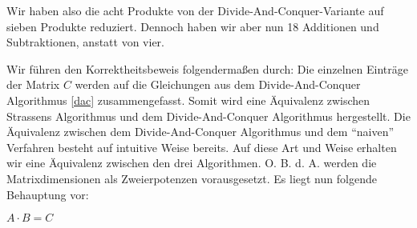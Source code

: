 Wir haben also die acht Produkte von der Divide-And-Conquer-Variante auf sieben Produkte reduziert. Dennoch haben wir aber nun 18 Additionen und Subtraktionen, anstatt von vier. 

Wir führen den Korrektheitsbeweis folgendermaßen durch: Die einzelnen Einträge der Matrix $C$ werden auf die Gleichungen aus dem Divide-And-Conquer Algorithmus \ref{dac} zusammengefasst. Somit wird eine Äquivalenz zwischen Strassens Algorithmus und dem Divide-And-Conquer Algorithmus hergestellt. Die Äquivalenz zwischen dem Divide-And-Conquer Algorithmus und dem \enquote{naiven} Verfahren besteht auf intuitive Weise bereits. Auf diese Art und Weise erhalten wir eine Äquivalenz zwischen den drei Algorithmen. O. B. d. A. werden die Matrixdimensionen als Zweierpotenzen vorausgesetzt. Es liegt nun folgende Behauptung vor:

\begin{prop}
    $A \cdot B = C$
\end{prop}

